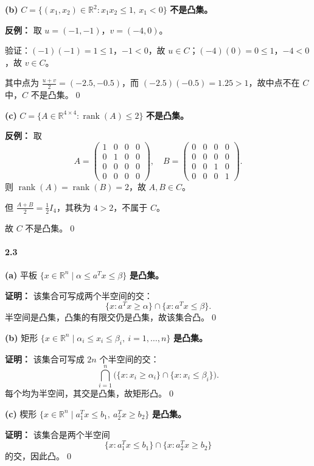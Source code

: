 \documentclass[12pt,a4paper]{article}
\begin{document}
\textbf{(b)} $C=\{(x_1,x_2)\in\mathbb{R}^2 : x_1x_2\le1,\ x_1<0\}$ \textbf{不是凸集。}

\textbf{反例：} 取 $u=(-1,-1)$，$v=(-4,0)$。

验证：$(-1)(-1)=1\le1$，$-1<0$，故 $u\in C$；$(-4)(0)=0\le1$，$-4<0$，故 $v\in C$。

其中点为 $\frac{u+v}{2}=(-2.5,-0.5)$，而 $(-2.5)(-0.5)=1.25>1$，故中点不在 $C$ 中，$C$ 不是凸集。\qed

\textbf{(c)} $C=\{A\in\mathbb{R}^{4\times4}:\operatorname{rank}(A)\le2\}$ \textbf{不是凸集。}

\textbf{反例：} 取
\[
  A=\begin{pmatrix}1&0&0&0\\0&1&0&0\\0&0&0&0\\0&0&0&0\end{pmatrix},\quad
  B=\begin{pmatrix}0&0&0&0\\0&0&0&0\\0&0&1&0\\0&0&0&1\end{pmatrix}.
\]
则 $\operatorname{rank}(A)=\operatorname{rank}(B)=2$，故 $A,B\in C$。

但 $\frac{A+B}{2}=\frac{1}{2}I_4$，其秩为 $4>2$，不属于 $C$。

故 $C$ 不是凸集。\qed

\paragraph{2.3}

\textbf{(a)} 平板 $\{x\in\mathbb{R}^n\mid \alpha\le a^Tx\le\beta\}$ \textbf{是凸集。}

\textbf{证明：} 该集合可写成两个半空间的交：
\[
  \{x:a^Tx\ge\alpha\}\cap\{x:a^Tx\le\beta\}.
\]
半空间是凸集，凸集的有限交仍是凸集，故该集合凸。\qed

\textbf{(b)} 矩形 $\{x\in\mathbb{R}^n\mid \alpha_i\le x_i\le\beta_i,\ i=1,\dots,n\}$ \textbf{是凸集。}

\textbf{证明：} 该集合可写成 $2n$ 个半空间的交：
\[
  \bigcap_{i=1}^n\bigl(\{x:x_i\ge\alpha_i\}\cap\{x:x_i\le\beta_i\}\bigr).
\]
每个均为半空间，其交是凸集，故矩形凸。\qed

\textbf{(c)} 楔形 $\{x\in\mathbb{R}^n\mid a_1^Tx\le b_1,\ a_2^Tx\ge b_2\}$ \textbf{是凸集。}

\textbf{证明：} 该集合是两个半空间
\[
  \{x:a_1^Tx\le b_1\}\cap\{x:a_2^Tx\ge b_2\}
\]
的交，因此凸。\qed
\end{document}
